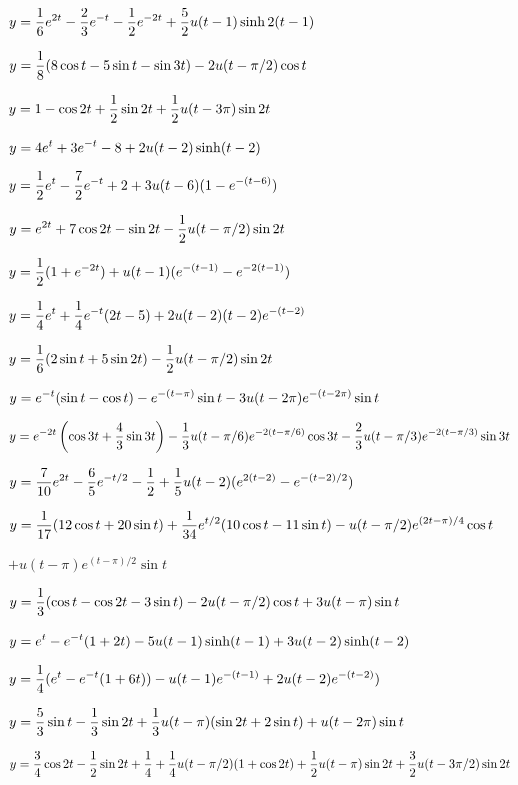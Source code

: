 $\displaystyle{y=\frac{1}{6}e^{2t}-\frac{2}{3}e^{-t}-\frac{1}{2}e^{-2t}+\frac{5}{2}u(t-1)\sinh2(t-1)}$



$\displaystyle{y=\frac{1}{8}(8\cos t-5\sin t-\sin3t)-2u(t-\pi/2)\cos t}$


$\displaystyle{y=1-\cos2t+\frac{1}{2}\sin2t+\frac{1}{2}u(t-3\pi)\sin2t}$


$\displaystyle{y=4e^{t}+3e^{-t}-8+2u(t-2)\sinh(t-2)}$


$\displaystyle{y=\frac{1}{2}e^{t}-\frac{7}{2}e^{-t}+2+3u(t-6)(1-e^{-(t-6)})}$


$\displaystyle{y=e^{2t}+7\cos 2t-\sin2t-\frac{1}{2}u(t-\pi/2)\sin  2t}$


$\displaystyle{y=\frac{1}{2}(1+e^{-2t})+u(t-1)(e^{-(t-1)}-e^{-2(t-1)})}$




$\displaystyle{y=\frac{1}{4}e^{t}+\frac{1}{4}e^{-t}(2t-5)+2u(t-2)(t-2)e^{-(t-2)}}$


$\displaystyle{y=\frac{1}{6}(2\sin t+5\sin 2t)-\frac{1}{2}u(t-\pi/2)\sin2t}$


$\displaystyle{y=e^{-t}(\sin t-\cos t)-e^{-(t-\pi)}\sin t-3u(t-2\pi)e^{-(t-2\pi)}\sin t}$


$\displaystyle{y=e^{-2t}\left(\cos 3t+\frac{4}{3}\sin3t\right)-\frac{1}{3}
u(t-\pi/6)e^{-2(t-\pi/6)}\cos3t-\frac{2}{3}u(t-\pi/3)e^{-2(t-\pi/3)}\sin3t}$


$\displaystyle{y=\frac{7}{10}e^{2t}-\frac{6}{5}e^{-t/2}-\frac{1}{2}+\frac{1}{5}u(t-2)}
(e^{2(t-2)}-e^{-(t-2)/2})$


$\displaystyle{y=\frac{1}{17}(12\cos t+20\sin t)+\frac{1}{34}e^{t/2}(10\cos t-11\sin t)
-u(t-\pi/2)e^{(2t-\pi)/4}\cos t}$

\hspace{.9in} $+u(t-\pi)e^{(t-\pi)/2}\sin t$


$\displaystyle{y=\frac{1}{3}(\cos t-\cos2t-3\sin t)-2u(t-\pi/2)\cos t+3u(t-\pi)\sin
t}$


$\displaystyle{y=e^{t}-e^{-t}(1+2t)-5u(t-1)\sinh(t-1)+3u(t-2)\sinh (t-2)}$


$\displaystyle{y=\frac{1}{4}(e^{t}-e^{-t}(1+6t))-u(t-1)e^{-(t-1)}+2u(t-2)e^{-(t-2)})}$


$\displaystyle{y=\frac{5}{3}\sin t-\frac{1}{3}\sin2t+\frac{1}{3}u(t-\pi)(\sin2t+2\sin t)
+u(t-2\pi)\sin t}$


$\displaystyle{y=\frac{3}{4}\cos2t-\frac{1}{2}\sin2t+\frac{1}{4}+\frac{1}{4}u(t-\pi/2)
(1+\cos2t)+\frac{1}{2}u(t-\pi)\sin2t+\frac{3}{2}u(t-3\pi/2)\sin 2t}$


